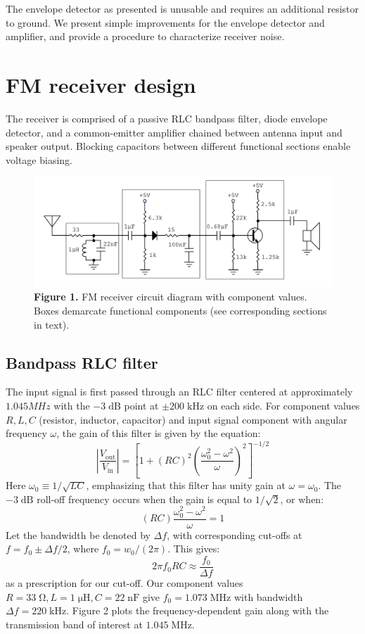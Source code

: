\documentclass[11pt]{article}
\newcommand {\mt}{\mathrm}
\newcommand {\unit}[1]{\; \mt{#1}}
\begin{document}
The envelope detector as presented is unusable and requires an additional
resistor to ground.  We present simple improvements for the envelope detector
and amplifier, and provide a procedure to characterize receiver noise.

\section{FM receiver design}

The receiver is comprised of a passive RLC bandpass filter, diode envelope
detector, and a common-emitter amplifier chained between antenna input and
speaker output.  Blocking capacitors between different functional sections
enable voltage biasing.

\begin{figure}[h]
    \centering
    \includegraphics[scale=0.5]{schematics/receiver_box.png} \\
    \textbf{Figure 1.} FM receiver circuit diagram with component values.\\
    Boxes demarcate functional components (see corresponding sections in text).
\end{figure}

\subsection{Bandpass RLC filter}

The input signal is first passed through an RLC filter centered at
approximately $1.045 MHz$ with the $-3 \unit{dB}$ point at $\pm 200 \unit{kHz}$
on each side.  For component values $R, L, C$ (resistor, inductor, capacitor)
and input signal component with angular frequency $\omega$, the gain of this
filter is given by the equation:
\[
  \left| \frac{V_{\mt{out}}}{V_{\mt{in}}} \right| =
    \left[
      1 + (RC)^2 \left(\frac{\omega_0^2 - \omega^2}{\omega}\right)^2
    \right]^{-1/2}
\]
Here $\omega_0 \equiv 1 / \sqrt{LC}$, emphasizing that this filter has unity
gain at $\omega = \omega_0$.  The $-3 \unit{dB}$ roll-off frequency occurs
when the gain is equal to $1/\sqrt{2}$, or when:
\[
  (RC) \frac{\omega_0^2-\omega^2}{\omega} = 1
\]
Let the bandwidth be denoted by $\Delta f$, with corresponding cut-offs at
$f = f_0 \pm \Delta f /2$, where $f_0 = w_0/(2\pi)$.  This gives:
\[
  2 \pi f_0 RC \approx \frac{f_0}{\Delta f}
\]
as a prescription for our cut-off.  Our component values $R = 33 \unit{\Omega},
L = 1 \unit{\mu H}, C = 22 \unit{nF}$ give $f_0 = 1.073 \unit{MHz}$ with
bandwidth $\Delta f = 220 \unit{kHz}$.  Figure 2 plots the frequency-dependent
gain along with the transmission band of interest at $1.045 \unit{MHz}$.
\end{document}
